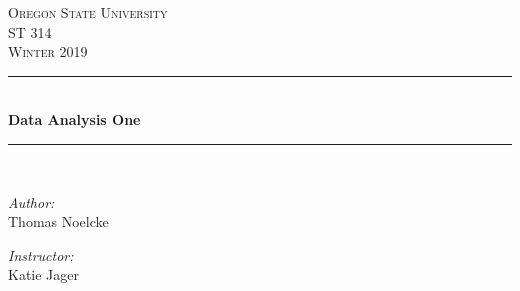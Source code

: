 \documentclass[letterpaper, onecolumn,10pt]{IEEEtran}
\begin{document}
    \begin{titlepage}
    \newcommand{\HRule}{\rule{\linewidth}{0.5mm}}
    \center
    \textsc{\Large Oregon State University}\\[1.5cm]
    \textsc{\Large ST 314}\\[0.5cm]
    \textsc{\Large Winter 2019}\\[0.5cm]
    \HRule \\[0.4cm]
    { \huge \bfseries Data Analysis One}\\[0.4cm] %
    \HRule \\[1.5cm]
    \begin{minipage}{0.4\textwidth}
        \begin{flushleft} \large
        \emph{Author:}\\
        Thomas Noelcke
        \end{flushleft}
    \end{minipage}
    \begin{minipage}{0.4\textwidth}
        \begin{flushright} \large
        \emph{Instructor:} \\
        Katie Jager\\
        \end{flushright}
    \end{minipage}\\[2cm]
		\end{titlepage}
        
        \iffalse
        For each random variable:
        a. State the distribution that will best model random variable. Choose from the common distributions:
        Uniform, Exponential or Normal distribution. Explain your reasoning.
        b. State the parameter values that describe the distribution.
        c. Give the probability density function. 

        Random Variable 1.
        The maintenance manager at a chemical facility know that times between repairs for a specific chemical
        reactor is modeled by a distribution that is positively skewed, with no upper limit. The average time
        between a repair is 100 days.
        Random Variable 2.
        An agricultural study found the percent of butterfat in the milk of 2-year old Canadian dairy cows is
        symmetrically distributed. The percent of butterfat in the study had an average of 4.5\% and a standard
        deviation of 0.4\%. The butterfat percentages were more likely to be near the mean than further away.
        Random Variable 3.
        During a routine check, an engineer discovers that a pump has failed for a production process between the time period of 2:00PM and 4:00PM. Consider the time of failure is a random variable, where the pump has an equal chance of failing at anytime during the period between 2:00PM and 4:00PM
        \fi
\end{document}
